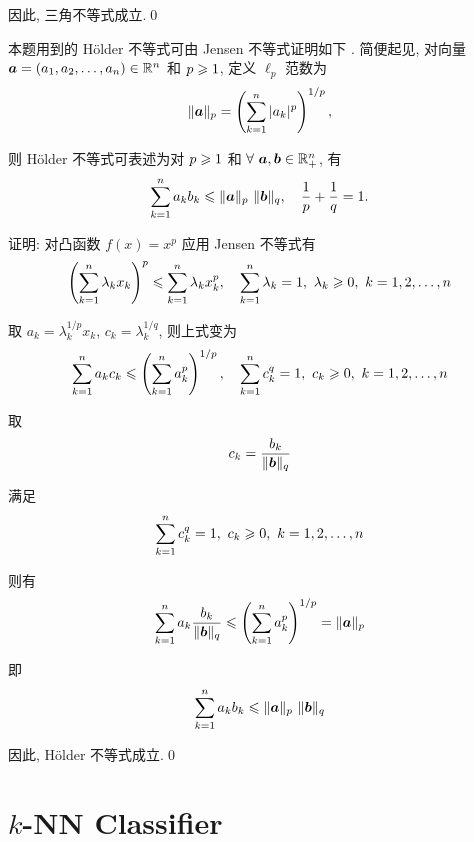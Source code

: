 \documentclass{article}
\begin{document}
因此, 三角不等式成立.\qed

本题用到的 H{\"o}lder 不等式可由 Jensen 不等式证明如下 \cite{Holder_inequality}. 简便起见, 对向量 $\bm{a}=(a_1,a_2,\dots,a_n)\in\mathbb{R}^n$ 和 $p\geqslant1$, 定义 $\ell_p$ 范数为
\begin{equation}
  \|\bm{a}\|_p=\left(\sum_{k=1}^n|a_k|^p\right)^{1/p},
\end{equation}

则 H{\"o}lder 不等式可表述为对 $p\geqslant1$ 和 $\forall~\bm{a},\bm{b}\in\mathbb{R}_+^n$, 有
\begin{equation}
  \sum_{k=1}^na_kb_k\leqslant\|\bm{a}\|_p~\|\bm{b}\|_q,\quad\frac{1}{p}+\frac{1}{q}=1.
\end{equation}

证明: 对凸函数 $f(x)=x^p$ 应用 Jensen 不等式有
\begin{equation}
  \left(\sum_{k=1}^n\lambda_kx_k\right)^p\leqslant\sum_{k=1}^n\lambda_kx_k^p,\quad\sum_{k=1}^n\lambda_k=1,~\lambda_k\geqslant0,~k=1,2,\dots,n
\end{equation}

取 $a_k=\lambda_k^{1/p}x_k$, $c_k=\lambda_k^{1/q}$, 则上式变为
\begin{equation}
  \sum_{k=1}^na_kc_k\leqslant\left(\sum_{k=1}^na_k^p\right)^{1/p},\quad\sum_{k=1}^nc_k^q=1,~c_k\geqslant0,~k=1,2,\dots,n
\end{equation}

取
\begin{equation}
  c_k=\frac{b_k}{\|\bm{b}\|_q}
\end{equation}

满足
\begin{equation}
  \sum_{k=1}^nc_k^q=1,~c_k\geqslant0,~k=1,2,\dots,n
\end{equation}

则有
\begin{equation}
  \sum_{k=1}^na_k\frac{b_k}{\|\bm{b}\|_q}\leqslant\left(\sum_{k=1}^na_k^p\right)^{1/p}=\|\bm{a}\|_p
\end{equation}

即
\begin{equation}
  \sum_{k=1}^na_kb_k\leqslant\|\bm{a}\|_p~\|\bm{b}\|_q
\end{equation}

因此, H{\"o}lder 不等式成立.\qed

\section*{$k$-NN Classifier}
\end{document}
